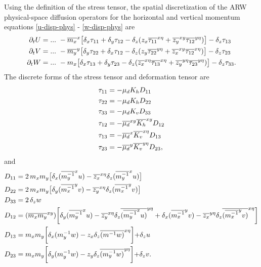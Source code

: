 Using the definition of the stress tensor, the spatial discretization of the
ARW physical-space diffusion operators for the horizontal and vertical
momentum equations
\eqref{u-disp-phys} - \eqref{w-disp-phys} are
%
\begin{align}
\partial_t U &= ...\,\,
- {\overline{m_x}}^x \bigl[ \delta_x \tau_{11} + \delta_y \tau_{12} 
- \delta_z 
( z_x {\overline{\tau_{11}}}^{x\eta} + {\overline {z_y}}^{xy} 
{\overline{\tau_{12}}}^{y\eta}) \bigr]
-\delta_z \tau_{13}
\notag \\
%
\partial_t V &= ...\,\,
- {\overline{m_y}}^y \bigl[ \delta_y \tau_{22} + \delta_x \tau_{12} 
- \delta_z 
( z_y {\overline{\tau_{22}}}^{y\eta} + {\overline {z_x}}^{xy} 
{\overline{\tau_{12}}}^{x\eta}) \bigr]
-\delta_z \tau_{23}
\notag \\
%
\partial_t W &= ...\,\,
- m_x \bigl[ \delta_x \tau_{13} + \delta_y \tau_{23} 
- \delta_z ( 
{\overline {z_x}}^{x\eta} {\overline{\tau_{13}}}^{x\eta} 
+{\overline {z_y}}^{y\eta} {\overline{\tau_{23}}}^{y\eta} 
)
\bigr]
- \delta_z \tau_{33}.
\notag
\end{align}
%
\noindent
The discrete forms of the stress tensor and deformation tensor are
\noindent
%
\begin{align}
\tau_{11} &= -\mu_d K_h D_{11} 
\notag \\
%
\tau_{22} &= -\mu_d K_h D_{22} 
\notag \\
%
\tau_{33} &= -\mu_d K_v D_{33} 
\notag \\
%
\tau_{12} &= -\overline {\mu_d}^{xy} 
\overline {K_h}^{xy} D_{12} 
\notag \\
%
\tau_{13} &= -\overline {\mu_d}^{x} 
\overline {K_v}^{x\eta} D_{13} 
\notag \\
%
\tau_{23} &= -\overline {\mu_d}^{y} 
\overline {K_v}^{y\eta} D_{23},
\notag
%
\end{align}
%
\noindent
and
%
\begin{align}
D_{11} &= 2 \, m_x m_y \bigl[ \delta_x ({\overline {m_y^{-1}}}^x u) 
- {\overline{z_x}}^{x\eta} \delta_z ({\overline {m_y^{-1}}}^x u) \bigl] 
\notag \\
%
D_{22} &= 2 \, m_x m_y \bigl[ \delta_y ({\overline {m_x^{-1}}}^y v) 
- {\overline{z_y}}^{x\eta} \delta_z ({\overline {m_x^{-1}}}^y v) \bigl] 
\notag \\
%
D_{33} &= 2 \, \delta_z w
\notag \\
%
D_{12} &= (\overline{m_x m_y}^{xy}) \biggl[ 
\delta_y ({\overline {m_y^{-1}}}^x u) 
- {\overline{z_y}}^{x\eta} 
\delta_z {\overline{({\overline {m_y^{-1}}}^x u)}^{y\eta}} 
+ \delta_x ({\overline {m_x^{-1}}}^y v) 
- {\overline{z_x}}^{y\eta}
\delta_z {\overline{({\overline {m_x^{-1}}}^y v)}^{x\eta}} 
\biggl] 
\notag \\
%
D_{13} &= m_x m_y \biggl[ 
\delta_x (m_y^{-1} w) 
- z_x \delta_z \overline{(m^{-1} w)}^{x\eta}
\biggl] 
+ \delta_z u
\notag \\
%
D_{23} &= m_x m_y \biggl[ 
\delta_y (m_y^{-1} w) 
- z_y \delta_z \overline{(m_y^{-1} w)}^{y\eta}
\biggl] 
+ \delta_z v.
\notag
%
\end{align}

